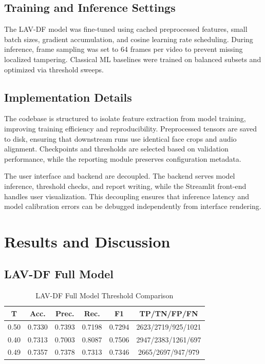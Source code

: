 \documentclass[conference]{IEEEtran}
\begin{document}
\subsection{Training and Inference Settings}
The LAV-DF model was fine-tuned using cached preprocessed features, small batch sizes, gradient accumulation, and cosine learning rate scheduling. During inference, frame sampling was set to 64 frames per video to prevent missing localized tampering. Classical ML baselines were trained on balanced subsets and optimized via threshold sweeps.

\subsection{Implementation Details}
The codebase is structured to isolate feature extraction from model training, improving training efficiency and reproducibility. Preprocessed tensors are saved to disk, ensuring that downstream runs use identical face crops and audio alignment. Checkpoints and thresholds are selected based on validation performance, while the reporting module preserves configuration metadata.

The user interface and backend are decoupled. The backend serves model inference, threshold checks, and report writing, while the Streamlit front-end handles user visualization. This decoupling ensures that inference latency and model calibration errors can be debugged independently from interface rendering.

\section{Results and Discussion}
\subsection{LAV-DF Full Model}
\begin{table}[htbp]
\caption{LAV-DF Full Model Threshold Comparison}
\centering
\begin{tabular}{cccccc}
\toprule
T & Acc. & Prec. & Rec. & F1 & TP/TN/FP/FN \\
\midrule
0.50 & 0.7330 & 0.7393 & 0.7198 & 0.7294 & 2623/2719/925/1021 \\
0.40 & 0.7313 & 0.7003 & 0.8087 & 0.7506 & 2947/2383/1261/697 \\
0.49 & 0.7357 & 0.7378 & 0.7313 & 0.7346 & 2665/2697/947/979 \\
\bottomrule
\end{tabular}
\end{table}
\end{document}
